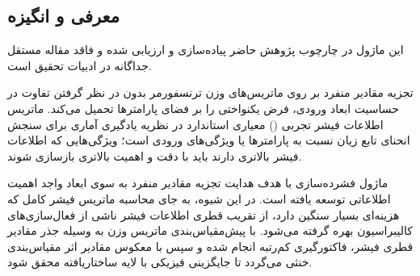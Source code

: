 \subsection{معرفی و انگیزه}
این ماژول در چارچوب پژوهش حاضر پیاده‌سازی و ارزیابی شده و فاقد مقاله مستقل جداگانه در ادبیات تحقیق است.

تجزیه مقادیر منفرد بر روی ماتریس‌های وزن ترنسفورمر بدون در نظر گرفتن تفاوت در حساسیت ابعاد ورودی، فرض یکنواختی را بر فضای پارامترها تحمیل می‌کند. ماتریس اطلاعات فیشر تجربی () معیاری استاندارد در نظریه یادگیری آماری برای سنجش انحنای تابع زیان نسبت به پارامترها یا ویژگی‌های ورودی است؛ ویژگی‌هایی که اطلاعات فیشر بالاتری دارند باید با دقت و اهمیت بالاتری بازسازی شوند.

ماژول فشرده‌سازی  با هدف هدایت تجزیه مقادیر منفرد به سوی ابعاد واجد اهمیت اطلاعاتی توسعه یافته است. در این شیوه، به جای محاسبه ماتریس فیشر کامل که هزینه‌ای بسیار سنگین دارد، از تقریب قطری اطلاعات فیشر ناشی از فعال‌سازی‌های کالیبراسیون بهره گرفته می‌شود. با پیش‌مقیاس‌بندی ماتریس وزن به وسیله جذر مقادیر قطری فیشر، فاکتورگیری کم‌رتبه انجام شده و سپس با معکوس مقادیر اثر مقیاس‌بندی خنثی می‌گردد تا جایگزینی فیزیکی با لایه ساختاریافته  محقق شود.
